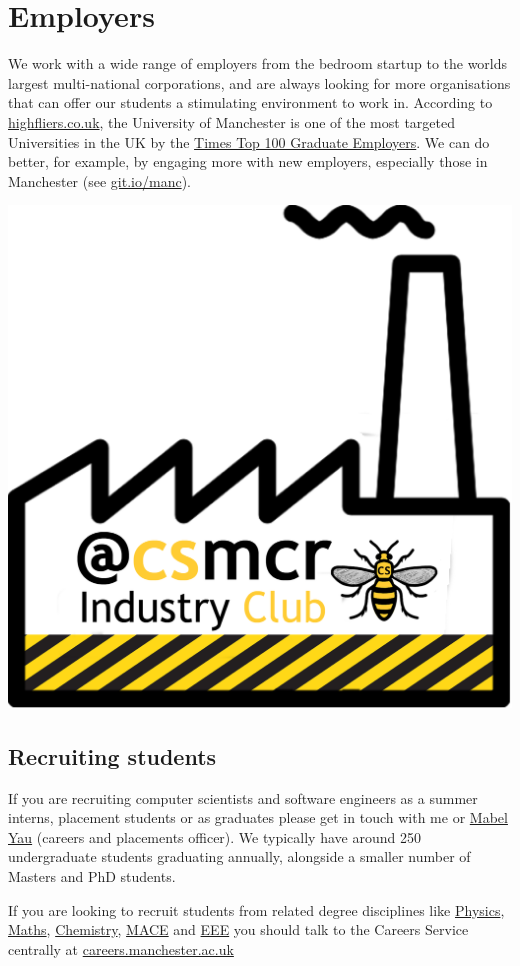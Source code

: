 \documentclass[12pt,]{book}
\begin{document}
\hypertarget{employers}{%
\chapter{Employers}\label{employers}}

We work with a wide range of employers from the bedroom startup to the worlds largest multi-national corporations, and are always looking for more organisations that can offer our students a stimulating environment to work in. According to \href{https://www.highfliers.co.uk}{highfliers.co.uk}, the University of Manchester is one of the most targeted Universities in the UK by the \href{https://www.top100graduateemployers.com}{Times Top 100 Graduate Employers}. We can do better, for example, by engaging more with new employers, especially those in Manchester (see \href{https://git.io/manc}{git.io/manc}).

\begin{center}\includegraphics[width=0.4\linewidth]{images/industry-club-black} \end{center}

\hypertarget{recruiting-students}{%
\section{Recruiting students}\label{recruiting-students}}

If you are recruiting computer scientists and software engineers as a summer interns, placement students or as graduates please get in touch with me or \href{https://uk.linkedin.com/in/mabel-yau}{Mabel Yau} (careers and placements officer). We typically have around 250 undergraduate students graduating annually, alongside a smaller number of Masters and PhD students.

If you are looking to recruit students from related degree disciplines like \href{https://www.physics.manchester.ac.uk/}{Physics}, \href{https://www.maths.manchester.ac.uk/}{Maths}, \href{https://www.chemistry.manchester.ac.uk/}{Chemistry}, \href{https://www.mace.manchester.ac.uk/}{MACE} and \href{https://www.eee.manchester.ac.uk/}{EEE} you should talk to the Careers Service centrally at \href{http://www.careers.manchester.ac.uk/}{careers.manchester.ac.uk}
\end{document}

